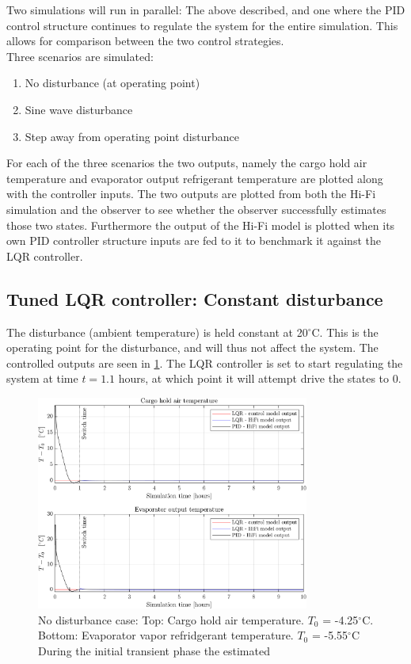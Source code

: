 Two simulations will run in parallel: The above described, and one where the PID control structure continues to regulate the system for the entire simulation. This allows for comparison between the two control strategies.\\

Three scenarios are simulated:

\begin{enumerate}
	\item No disturbance (at operating point)
	\item Sine wave disturbance
	\item Step away from operating point disturbance
\end{enumerate}

\noindent For each of the three scenarios the two outputs, namely the cargo hold air temperature and evaporator output refrigerant temperature are plotted along with the controller inputs. The two outputs are plotted from both the Hi-Fi simulation and the observer to see whether the observer successfully estimates those two states. Furthermore the output of the Hi-Fi model is plotted when its own PID controller structure inputs are fed to it to benchmark it against the LQR controller.

\subsection{Tuned LQR controller: Constant disturbance}
The disturbance (ambient temperature) is held constant at 20$^{\circ}$C. This is the operating point for the disturbance, and will thus not affect the system. The controlled outputs are seen in \cref{fig:LQR_wellTuned_noDist}. The LQR controller is set to start regulating the system at time $t=1.1$ hours, at which point it will attempt drive the states to 0.


\begin{figure}[H]
	\centering
	\includegraphics[width=0.8\textwidth]{Graphics/fig_LQRvsKresten_noDist.png}
	\caption{No disturbance case: Top: Cargo hold air temperature. $T_0$ = -4.25$^{\circ}$C. Bottom: Evaporator vapor refridgerant temperature. $T_0$ = -5.55$^{\circ}$C\\\hspace{\textwidth} During the initial transient phase the estimated }
	\label{fig:LQR_wellTuned_noDist}
\end{figure}

